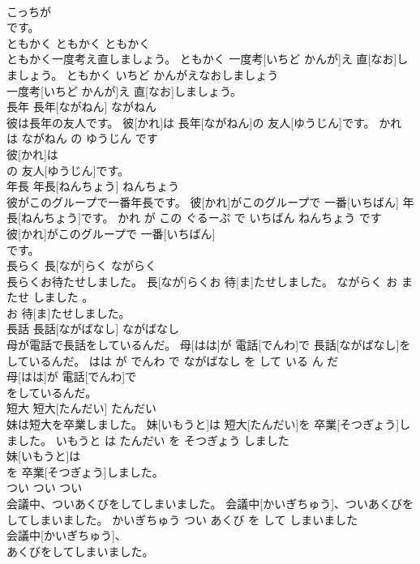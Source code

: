 \documentclass[8pt]{extreport}
\begin{document}
\begin{CJK}{UTF8}{min}
\\	こっちが
\\	です。			
\\	ともかく	ともかく	ともかく	
\\	ともかく一度考え直しましょう。	ともかく 一度考[いちど かんが]え 直[なお]しましょう。	ともかく いちど かんがえなおしましょう	
\\	一度考[いちど かんが]え 直[なお]しましょう。			
\\	長年	長年[ながねん]	ながねん	
\\	彼は長年の友人です。	彼[かれ]は 長年[ながねん]の 友人[ゆうじん]です。	かれ は ながねん の ゆうじん です	
\\	彼[かれ]は
\\	の 友人[ゆうじん]です。			
\\	年長	年長[ねんちょう]	ねんちょう	
\\	彼がこのグループで一番年長です。	彼[かれ]がこのグループで 一番[いちばん] 年長[ねんちょう]です。	かれ が この ぐるーぷ で いちばん ねんちょう です	
\\	彼[かれ]がこのグループで 一番[いちばん]
\\	です。			
\\	長らく	長[なが]らく	ながらく	
\\	長らくお待たせしました。	長[なが]らくお 待[ま]たせしました。	ながらく お またせ しました 。	
\\	お 待[ま]たせしました。			
\\	長話	長話[ながばなし]	ながばなし	
\\	母が電話で長話をしているんだ。	母[はは]が 電話[でんわ]で 長話[ながばなし]をしているんだ。	はは が でんわ で ながばなし を して いる ん だ	
\\	母[はは]が 電話[でんわ]で
\\	をしているんだ。			
\\	短大	短大[たんだい]	たんだい	
\\	妹は短大を卒業しました。	妹[いもうと]は 短大[たんだい]を 卒業[そつぎょう]しました。	いもうと は たんだい を そつぎょう しました	
\\	妹[いもうと]は
\\	を 卒業[そつぎょう]しました。			
\\	つい	つい	つい	
\\	会議中、ついあくびをしてしまいました。	会議中[かいぎちゅう]、ついあくびをしてしまいました。	かいぎちゅう つい あくび を して しまいました	
\\	会議中[かいぎちゅう]、
\\	あくびをしてしまいました。			

\end{CJK}
\end{document}

